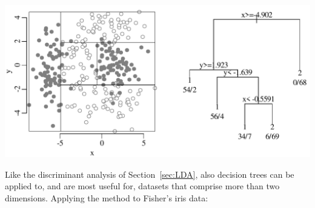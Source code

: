 \noindent\begin{minipage}[t][][b]{.7\textwidth}
\includegraphics[width=\textwidth]{../figures/optimalCART.pdf}\\
\end{minipage}
\begin{minipage}[t][][t]{.3\textwidth}
  \label{fig:optimalCART}
\end{minipage}

Like the discriminant analysis of Section~\ref{sec:LDA}, also decision
trees can be applied to, and are most useful for, datasets that
comprise more than two dimensions. Applying the method to Fisher's
iris data:

